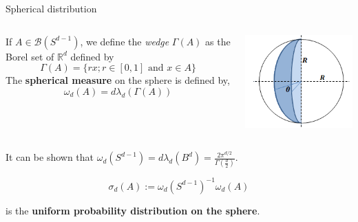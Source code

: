 \documentclass{beamer}
\begin{document}
  \begin{frame}{Spherical distribution}

    \begin{columns}
      \begin{column}{0.75\textwidth}

        \begin{definition}
          If $A \in \mathcal{B}\left(S^{d-1}\right)$, we define the \emph{wedge}
          $\Gamma(A)$ as the Borel set
          of $\mathbb{R}^{d}$ defined by
          $$
          \Gamma(A)=\{r x ; r \in[0,1] \text { and } x \in A\}
          $$
          The \textbf{spherical measure} on the sphere is defined by,
          $$
          \omega_{d}(A)=d \lambda_{d}(\Gamma(A))
          $$
        \end{definition}
      \end{column}
      \pause
      \begin{column}{0.25\textwidth}  %
        \begin{center}
          \includegraphics[width=1\textwidth]{wedge.png}
        \end{center}
      \end{column}
    \end{columns}

    \pause

    It can be shown that $\omega_d(S^{d-1}) = d\lambda_d(B^d)  = \frac{2 \pi^{d /
        2}}{\Gamma\left(\frac{d}{2}\right)} $.

    \begin{equation*}
      \sigma_{d}(A):= \omega_d(S^{d-1})^{-1} \omega_d(A)
    \end{equation*}

    is the \textbf{uniform probability distribution on the sphere}.

  \end{frame}
\end{document}
